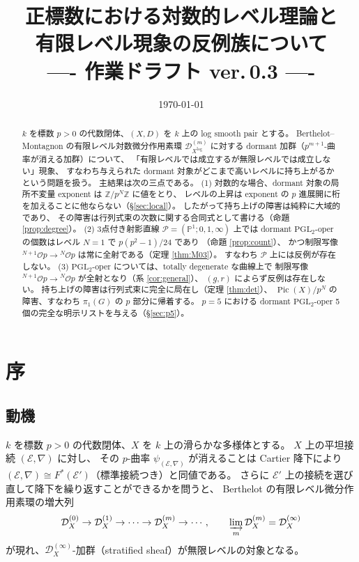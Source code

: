 \documentclass[a4paper,11pt]{ltjsarticle}
\title{正標数における対数的レベル理論と\\有限レベル現象の反例族について\\
\large ---- 作業ドラフト ver.\,0.3 ----}
\author{}
\date{\today}
\theoremstyle{plain}
\theoremstyle{definition}
\newcommand{\bbP}{\mathbb{P}}
\newcommand{\bbZ}{\mathbb{Z}}
\newcommand{\cD}{\mathcal{D}}
\newcommand{\cE}{\mathcal{E}}
\newcommand{\sP}{\mathscr{P}}
\newcommand{\Pic}{\operatorname{Pic}}
\newcommand{\Op}{\mathcal{O}p}
\begin{document}
\maketitle

\begin{abstract}
$k$ を標数 $p>0$ の代数閉体、$(X,D)$ を $k$ 上の log smooth pair とする。
Berthelot--Montagnon の有限レベル対数微分作用素環 $\cD^{(m)}_{X^{\log}}$ に対する
dormant 加群（$p^{m+1}$-曲率が消える加群）について、
「有限レベルでは成立するが無限レベルでは成立しない」現象、
すなわち与えられた dormant 対象がどこまで高いレベルに持ち上がるかという問題を扱う。
主結果は次の三点である。
(1) 対数的な場合、dormant 対象の局所不変量 exponent は $\bbZ/p^{N}\bbZ$ に値をとり、
レベルの上昇は exponent の $p$ 進展開に桁を加えることに他ならない（\S\ref{sec:local}）。
したがって持ち上げの障害は純粋に大域的であり、
その障害は行列式束の次数に関する合同式として書ける（命題 \ref{prop:degree}）。
(2) 3点付き射影直線 $\sP=(\bbP^1;0,1,\infty)$ 上では
dormant $\mathrm{PGL}_2$-oper の個数はレベル $N=1$ で $p(p^2-1)/24$ であり
（命題 \ref{prop:count}）、
かつ制限写像 ${}^{N+1}\Op\to{}^{N}\Op$ は常に全射である（定理 \ref{thm:M03}）。
すなわち $\sP$ 上には反例が存在しない。
(3) $\mathrm{PGL}_2$-oper については、totally degenerate な曲線上で
制限写像 ${}^{N+1}\Op\to{}^{N}\Op$ が全射となり（系 \ref{cor:general}）、
$(g,r)$ によらず反例は存在しない。
持ち上げの障害は行列式束に完全に局在し（定理 \ref{thm:det}）、
$\Pic(X)/p^N$ の障害、すなわち $\pi_1(G)$ の $p$ 部分に帰着する。
$p=5$ における dormant $\mathrm{PGL}_2$-oper 5 個の完全な明示リストを与える（\S\ref{sec:p5}）。
\end{abstract}

\tableofcontents

\section{序}\label{sec:intro}

\subsection{動機}

$k$ を標数 $p>0$ の代数閉体、$X$ を $k$ 上の滑らかな多様体とする。
$X$ 上の平坦接続 $(\cE,\nabla)$ に対し、
その $p$-曲率 $\psi_{(\cE,\nabla)}$ が消えることは
Cartier 降下により $(\cE,\nabla)\cong F^{*}(\cE')$（標準接続つき）と同値である。
さらに $\cE'$ 上の接続を選び直して降下を繰り返すことができるかを問うと、
Berthelot の有限レベル微分作用素環の増大列
\[
  \cD^{(0)}_X\to\cD^{(1)}_X\to\cdots\to\cD^{(m)}_X\to\cdots,
  \qquad \varinjlim_m\cD^{(m)}_X=\cD^{(\infty)}_X
\]
が現れ、$\cD^{(\infty)}_X$-加群（stratified sheaf）が無限レベルの対象となる。
\end{document}
